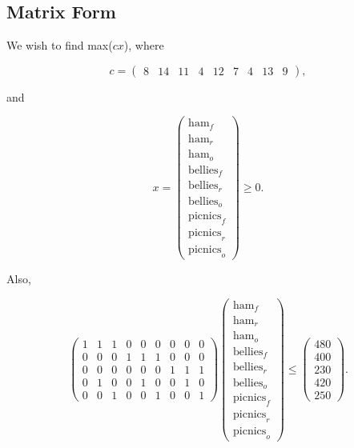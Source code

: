 \documentclass[letterpaper,10pt]{article}
\begin{document}
	\subsection{Matrix Form}
	We wish to find max($cx$), where
	
	\[
		c =
		\begin{pmatrix}
			8 & 14 & 11 & 4 & 12 & 7 & 4 & 13 & 9
		\end{pmatrix},
	\]

	and

	\[
		x =
		\begin{pmatrix}
			\text{ham}_f \\
			\text{ham}_r \\
			\text{ham}_o \\
			\text{bellies}_f \\
			\text{bellies}_r \\
			\text{bellies}_o \\
			\text{picnics}_f \\
			\text{picnics}_r \\
			\text{picnics}_o
		\end{pmatrix}
		\geq 0.
	\]

	Also,

	\[
		\begin{pmatrix}
			1 & 1 & 1 & 0 & 0 & 0 & 0 & 0 & 0 \\
			0 & 0 & 0 & 1 & 1 & 1 & 0 & 0 & 0 \\
			0 & 0 & 0 & 0 & 0 & 0 & 1 & 1 & 1 \\
			0 & 1 & 0 & 0 & 1 & 0 & 0 & 1 & 0 \\
			0 & 0 & 1 & 0 & 0 & 1 & 0 & 0 & 1
		\end{pmatrix}
		\begin{pmatrix}
			\text{ham}_f \\
			\text{ham}_r \\
			\text{ham}_o \\
			\text{bellies}_f \\
			\text{bellies}_r \\
			\text{bellies}_o \\
			\text{picnics}_f \\
			\text{picnics}_r \\
			\text{picnics}_o
		\end{pmatrix}
		\le
		\begin{pmatrix}
			480 \\
			400 \\
			230 \\
			420 \\
			250
		\end{pmatrix}.
	\]
\end{document}
